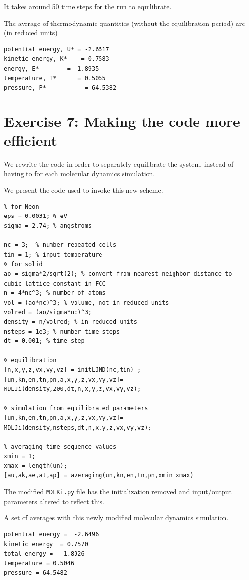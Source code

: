 \documentclass[12pt, oneside]{article}
\begin{document}
It takes around 50 time steps for the run to equilibrate. 

The average of thermodynamic quantities (without the equilibration period) are (in reduced units)

\begin{verbatim}
potential energy, U* = -2.6517
kinetic energy, K*    = 0.7583
energy, E* 	      = -1.8935
temperature, T*      = 0.5055
pressure, P*           = 64.5382
\end{verbatim}

\section{Exercise 7: Making the code more efficient}

We rewrite the code in order to separately equilibrate the system, instead of having to for each molecular dynamics simulation.  

We present the code used to invoke this new scheme.

\begin{verbatim}
% for Neon
eps = 0.0031; % eV
sigma = 2.74; % angstroms

nc = 3;  % number repeated cells
tin = 1; % input temperature
% for solid
ao = sigma*2/sqrt(2); % convert from nearest neighbor distance to cubic lattice constant in FCC
n = 4*nc^3; % number of atoms
vol = (ao*nc)^3; % volume, not in reduced units
volred = (ao/sigma*nc)^3;
density = n/volred; % in reduced units
nsteps = 1e3; % number time steps
dt = 0.001; % time step

% equilibration
[n,x,y,z,vx,vy,vz] = initLJMD(nc,tin) ;
[un,kn,en,tn,pn,a,x,y,z,vx,vy,vz]= MDLJi(density,200,dt,n,x,y,z,vx,vy,vz);

% simulation from equilibrated parameters
[un,kn,en,tn,pn,a,x,y,z,vx,vy,vz]= MDLJi(density,nsteps,dt,n,x,y,z,vx,vy,vz);

% averaging time sequence values
xmin = 1; 
xmax = length(un);
[au,ak,ae,at,ap] = averaging(un,kn,en,tn,pn,xmin,xmax)
\end{verbatim}

The modified \verb!MDLKi.py! file has the initialization removed and input/output parameters altered to reflect this.

A set of averages with this newly modified molecular dynamics simulation. 

\begin{verbatim}
potential energy =  -2.6496
kinetic energy  = 0.7570
total energy =  -1.8926
temperature = 0.5046
pressure = 64.5482
\end{verbatim}
\end{document}
